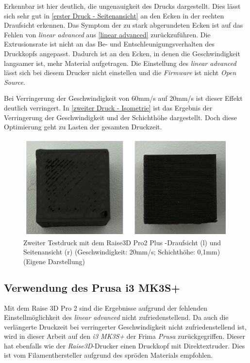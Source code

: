 Erkennbar ist hier deutlich, die ungenauigkeit des Drucks dargestellt. Dies lässt sich sehr gut in \autoref{erster Druck - Seitenansicht} an den Ecken in der rechten Draufsicht erkennen. Das Symptom der zu stark abgerundeten Ecken ist auf das Fehlen von \textit{linear advanced} aus \autoref{linear advanced} zurückzuführen. Die Extrusionsrate ist nicht an das Be- und Entschleunigungsverhalten des Druckkopfs angepasst. Dadurch ist an den Ecken, in denen die Geschwindigkeit langsamer ist, mehr Material aufgetragen. Die Einstellung des \textit{linear advanced} lässt sich bei diesem Drucker nicht einstellen und die \textit{Firmware} ist nicht \textit{Open Source}.

Bei Verringerung der Geschwindigkeit von 60mm/s auf 20mm/s ist dieser Effekt deutlich verringert. In \autoref{zweiter Druck - Isometrie} ist das Ergebnis der Verringerung der Geschwindigkeit und der Schichthöhe dargestellt. Doch diese Optimierung geht zu Lasten der gesamten Druckzeit. 

\begin{figure}[h]
	\centering
	\includegraphics[width=\linewidth]{bilder/2. Testdruck auf Raise Pro 3D Seitenansicht - Draufsicht.png}
        \caption[Zweiter Testdruck mit dem Raise3D Pro2 Plus - Isometrische Ansicht] {Zweiter Testdruck mit dem Raise3D Pro2 Plus -Draufsicht (l) und Seitenansicht (r) (Geschwindigkeit: 20mm/s; Schichthöhe: 0,1mm) (Eigene Darstellung)}
	\label{zweiter Druck - Isometrie}
\end{figure}

\subsection{Verwendung des Prusa i3 MK3S+}
\label{Drucker}

Mit dem Raise 3D Pro 2 sind die Ergebnisse aufgrund der fehlenden Einstellmöglichkeit des \textit{linear advanced} nicht zufriedenstellend. Da auch die verlängerte Druckzeit bei verringerter Geschwindigkeit nicht zufriedenstellend ist, wird in dieser Arbeit auf den \textit{i3 MK3S+} der Frima \textit{Prusa} zurückgegriffen. Dieser hat ebenfalls wie der \textit{Raise3D}-Drucker einen Druckkopf mit Direktextruder. Dies ist vom Filamenthersteller aufgrund des spröden Materials empfohlen.

